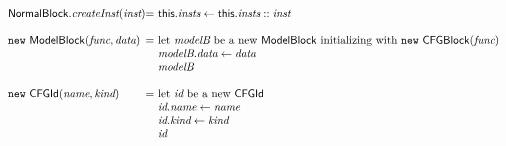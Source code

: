 \[\begin{array}{l@{}l@{~}l}
\NormalBlock.\emph{createInst}(\emph{inst})
& = & \this.\emph{insts} \leftarrow \this.\emph{insts} :: \emph{inst}\\
& & \\

\new\ \ModelBlock(\emph{func}, \emph{data})
& = & \text{let } \emph{modelB} \text{ be a new } \ModelBlock \text{ initializing with } \new\ \CFGBlock(\emph{func})\\
& & \emph{modelB}.\emph{data} \leftarrow \emph{data} \\
& & \emph{modelB}\\
& & \\

\new\ \CFGId(\emph{name}, \emph{kind})
& = & \text{let } \emph{id} \text{ be a new } \CFGId\\
& & \emph{id}.\emph{name} \leftarrow \emph{name} \\
& & \emph{id}.\emph{kind} \leftarrow \emph{kind} \\
& & \emph{id}\\
\end{array}
\]
